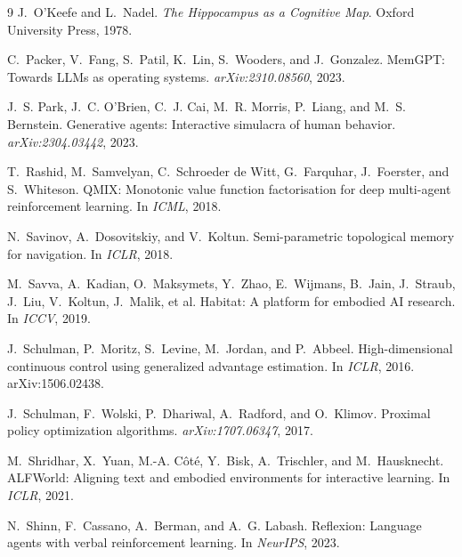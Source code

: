 \documentclass{article}
\begin{document}
{\begin{thebibliography}{9}
J.~O'Keefe and L.~Nadel.
\newblock \emph{The Hippocampus as a Cognitive Map}.
\newblock Oxford University Press, 1978.

C.~Packer, V.~Fang, S.~Patil, K.~Lin, S.~Wooders, and J.~Gonzalez.
\newblock MemGPT: Towards LLMs as operating systems.
\newblock \emph{arXiv:2310.08560}, 2023.

J.~S. Park, J.~C. O'Brien, C.~J. Cai, M.~R. Morris, P.~Liang, and M.~S. Bernstein.
\newblock Generative agents: Interactive simulacra of human behavior.
\newblock \emph{arXiv:2304.03442}, 2023.

T.~Rashid, M.~Samvelyan, C.~Schroeder de Witt, G.~Farquhar, J.~Foerster, and S.~Whiteson.
\newblock QMIX: Monotonic value function factorisation for deep multi-agent reinforcement learning.
\newblock In \emph{ICML}, 2018.

N.~Savinov, A.~Dosovitskiy, and V.~Koltun.
\newblock Semi-parametric topological memory for navigation.
\newblock In \emph{ICLR}, 2018.

M.~Savva, A.~Kadian, O.~Maksymets, Y.~Zhao, E.~Wijmans, B.~Jain, J.~Straub, J.~Liu, V.~Koltun, J.~Malik, et al.
\newblock Habitat: A platform for embodied AI research.
\newblock In \emph{ICCV}, 2019.

J.~Schulman, P.~Moritz, S.~Levine, M.~Jordan, and P.~Abbeel.
\newblock High-dimensional continuous control using generalized advantage estimation.
\newblock In \emph{ICLR}, 2016.
\newblock arXiv:1506.02438.

J.~Schulman, F.~Wolski, P.~Dhariwal, A.~Radford, and O.~Klimov.
\newblock Proximal policy optimization algorithms.
\newblock \emph{arXiv:1707.06347}, 2017.

M.~Shridhar, X.~Yuan, M.-A. C\^ot\'e, Y.~Bisk, A.~Trischler, and M.~Hausknecht.
\newblock ALFWorld: Aligning text and embodied environments for interactive learning.
\newblock In \emph{ICLR}, 2021.

N.~Shinn, F.~Cassano, A.~Berman, and A.~G. Labash.
\newblock Reflexion: Language agents with verbal reinforcement learning.
\newblock In \emph{NeurIPS}, 2023.


\end{thebibliography}}
\end{document}
